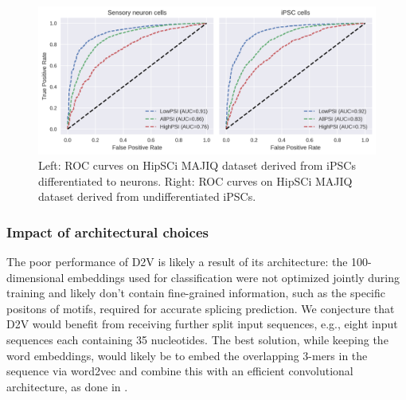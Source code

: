\begin{figure}
	\centering\includegraphics[width=1\textwidth]{../visualizations/ch5-results/majiq_neuron_ipsc_cross_psi_roc_auc_comparison.png} 
	\caption{Left: ROC curves on HipSCi MAJIQ dataset derived from iPSCs differentiated to neurons. Right: ROC curves on HipSCi MAJIQ dataset derived from undifferentiated iPSCs. }
	\label{fig:majiq_rocs_low_high}
\end{figure}




\subsubsection{Impact of architectural choices} \label{subsubsec:majiq_architectural_choices}
The poor performance of D2V is likely a result of its architecture: the 100-dimensional embeddings used for classification were not optimized jointly during training and likely don't contain fine-grained information, such as the specific positons of motifs, required for accurate splicing prediction. We conjecture that D2V would benefit from receiving further split input sequences, e.g., eight input sequences each containing 35 nucleotides. The best solution, while keeping the word embeddings, would likely be to embed the overlapping 3-mers in the sequence via word2vec and combine this with an efficient convolutional architecture, as done in \cite{d2vsplicing}.



